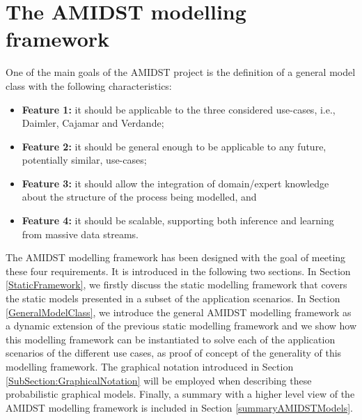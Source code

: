 \section{The AMIDST modelling framework}\label{section:AMIDSTmodelClass}

One of the main goals of the AMIDST project is the definition of a general model class with the following characteristics: 

\begin{itemize}
\item \textbf{Feature 1:} it should be applicable to the three considered use-cases, i.e., Daimler, Cajamar and Verdande;

\item \textbf{Feature 2:}  it should be general enough to be applicable to any future, potentially similar, use-cases;

\item \textbf{Feature 3:} it should allow the integration of domain/expert knowledge about the structure of the process being modelled, and

\item \textbf{Feature 4:} it should be scalable, supporting both inference and learning from massive data streams.

\end{itemize}



The AMIDST modelling framework has been designed with the goal of meeting these four requirements. It is introduced in
the following two sections. In Section \ref{StaticFramework}, we firstly discuss the static modelling framework that
covers the static models presented in a subset of the application scenarios. In Section \ref{GeneralModelClass}, we introduce the general AMIDST modelling framework as a dynamic extension of the previous static modelling framework and we show how this modelling framework can be instantiated to solve each of the application scenarios of the different use cases, as proof of concept of the generality of this modelling framework. The graphical notation introduced in Section \ref{SubSection:GraphicalNotation} will be employed when describing these probabilistic graphical models. Finally, a summary with a higher level view of the AMIDST modelling framework is included in Section \ref{summaryAMIDSTModels}.


